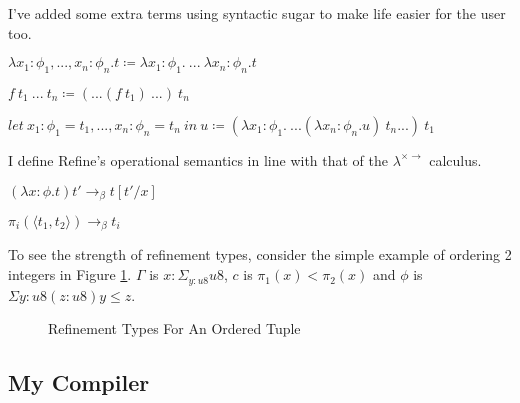 I've added some extra terms using syntactic sugar to make life easier for the user too.

\begin{center}
    $\lambda x_1: \phi_1, ..., x_n: \phi_n . t \coloneqq \lambda x_1: \phi_1 .\ ...\ \lambda x_n: \phi_n . t$

    $f\ t_1\ ...\ t_n \coloneqq (...(f\ t_1)\ ...)\ t_n$

    $let\ x_1: \phi_1 = t_1, ..., x_n: \phi_n = t_n\ in\ u \coloneqq (\lambda x_1: \phi_1 .\ ...(\lambda x_n: \phi_n . u)\ t_n...)\ t_1$
\end{center}

I define Refine's operational semantics in line with that of the $\lambda^{\times \rightarrow}$ calculus.

\begin{center}
    $(\lambda x: \phi . t) t' \rightarrow_\beta t[t'/x]$

    $\pi_i(\langle t_1, t_2 \rangle) \rightarrow_\beta t_i$
\end{center}

To see the strength of refinement types, consider the simple example of ordering 2 integers in
Figure \ref{fig:refinement_ordering}.
$\Gamma$ is $x: \Sigma_{y:u8} u8$, $c$ is $\pi_1(x) < \pi_2(x)$ and $\phi$ is $\Sigma{y:u8} (z:u8) y \leq z$.

\begin{figure}
    \centering
    \begin{prooftree}[separation=0.5em]
    \end{prooftree}
    \caption{Refinement Types For An Ordered Tuple}
    \label{fig:refinement_ordering}
\end{figure}

\subsection{My Compiler}

